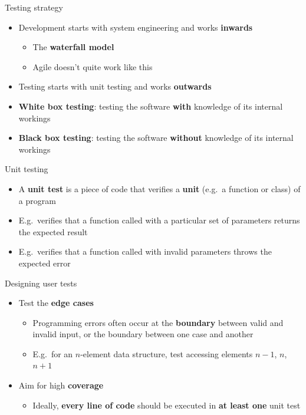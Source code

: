 \begin{frame}{Testing strategy}
    \begin{itemize}
        \item Development starts with system engineering and works \textbf{inwards} \pause
            \begin{itemize}
                \item The \textbf{waterfall model} \pause
                \item Agile doesn't quite work like this \pause
            \end{itemize}
        \item Testing starts with unit testing and works \textbf{outwards} \pause
        \item \textbf{White box testing}: testing the software \textbf{with} knowledge of its internal workings \pause
        \item \textbf{Black box testing}: testing the software \textbf{without} knowledge of its internal workings
    \end{itemize}
\end{frame}

\begin{frame}{Unit testing}
    \begin{itemize}
        \item A \textbf{unit test} is a piece of code that verifies a \textbf{unit} (e.g.\ a function or class) of a program \pause
        \item E.g.\ verifies that a function called with a particular set of parameters returns the expected result \pause
        \item E.g.\ verifies that a function called with invalid parameters throws the expected error
    \end{itemize}
\end{frame}

\begin{frame}{Designing user tests}
    \begin{itemize}
        \item Test the \textbf{edge cases} \pause
            \begin{itemize}
                \item Programming errors often occur at the \textbf{boundary} between valid and invalid input,
                    or the boundary between one case and another \pause
                \item E.g.\ for an $n$-element data structure, test accessing elements $n-1$, $n$, $n+1$ \pause
            \end{itemize}
        \item Aim for high \textbf{coverage} \pause
            \begin{itemize}
                \item Ideally, \textbf{every line of code} should be executed in \textbf{at least one} unit test
            \end{itemize}
    \end{itemize}
\end{frame}

